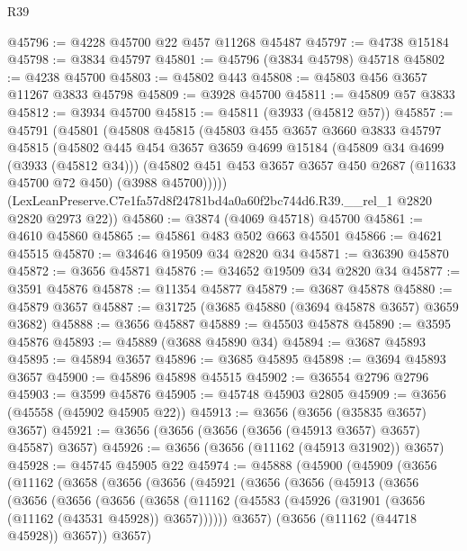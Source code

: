 \begin{lexlean}{R39}
\begin{coremodule}
@45796 := @4228 @45700 @22 @457 @11268 @45487
@45797 := @4738 @15184
@45798 := @3834 @45797
@45801 := @45796 (@3834 @45798) @45718
@45802 := @4238 @45700
@45803 := @45802 @443
@45808 := @45803 @456 @3657 @11267 @3833 @45798
@45809 := @3928 @45700
@45811 := @45809 @57 @3833
@45812 := @3934 @45700
@45815 := @45811 (@3933 (@45812 @57))
@45857 := @45791
    (@45801
      (@45808
        @45815
        (@45803
          @455
          @3657
          @3660
          @3833
          @45797
          @45815
          (@45802
            @445
            @454
            @3657
            @3659
            @4699
            @15184
            (@45809 @34 @4699 (@3933 (@45812 @34)))
            (@45802 @451 @453 @3657 @3657 @450 @2687 (@11633 @45700 @72 @450) (@3988 @45700)))))
      (LexLeanPreserve.C7e1fa57d8f24781bd4a0a60f2bc744d6.R39.__rel_1 @2820 @2820 @2973 @22))
@45860 := @3874 (@4069 @45718) @45700
@45861 := @4610 @45860
@45865 := @45861 @483 @502 @663 @45501
@45866 := @4621 @45515
@45870 := @34646 @19509 @34 @2820 @34
@45871 := @36390 @45870
@45872 := @3656 @45871
@45876 := @34652 @19509 @34 @2820 @34
@45877 := @3591 @45876
@45878 := @11354 @45877
@45879 := @3687 @45878
@45880 := @45879 @3657
@45887 := @31725 (@3685 @45880 (@3694 @45878 @3657) @3659 @3682)
@45888 := @3656 @45887
@45889 := @45503 @45878
@45890 := @3595 @45876
@45893 := @45889 (@3688 @45890 @34)
@45894 := @3687 @45893
@45895 := @45894 @3657
@45896 := @3685 @45895
@45898 := @3694 @45893 @3657
@45900 := @45896 @45898 @45515
@45902 := @36554 @2796 @2796
@45903 := @3599 @45876
@45905 := @45748 @45903 @2805
@45909 := @3656 (@45558 (@45902 @45905 @22))
@45913 := @3656 (@3656 (@35835 @3657) @3657)
@45921 := @3656 (@3656 (@3656 (@3656 (@45913 @3657) @3657) @45587) @3657)
@45926 := @3656 (@3656 (@11162 (@45913 @31902)) @3657)
@45928 := @45745 @45905 @22
@45974 := @45888
    (@45900
      (@45909
        (@3656
          (@11162
            (@3658
              (@3656
                (@3656
                  (@45921
                    (@3656
                      (@3656
                        (@45913
                          (@3656
                            (@3656
                              (@3656
                                (@3656
                                  (@3658
                                    (@11162
                                      (@45583
                                        (@45926 (@31901 (@3656 (@11162 (@43531 @45928)) @3657))))))
                                  @3657)
                                (@3656 (@11162 (@44718 @45928)) @3657))
                              @3657)

\end{coremodule}
\end{lexlean}
